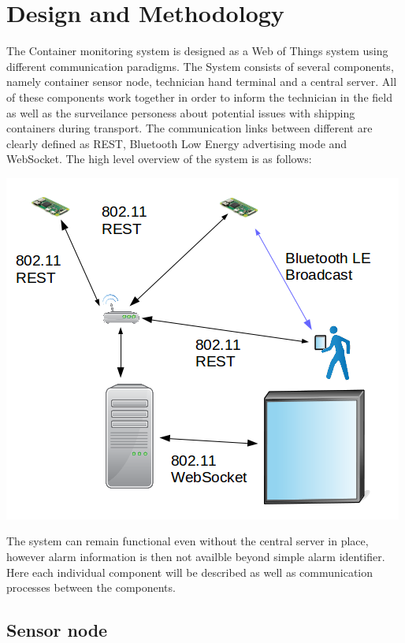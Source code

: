 \chapter{Design and Methodology}
\label{cha:design-and-method}


The Container monitoring system is designed as a Web of Things system using different communication paradigms. The System consists of several components, namely container sensor node, technician hand terminal and a central server. All of these components work together in order to inform the technician in the field as well as the surveilance personess about potential issues with shipping containers during transport. The communication links between different are clearly defined as REST, Bluetooth Low Energy advertising mode and WebSocket. The high level overview of the system is as follows:

\bigskip
\includegraphics[scale=0.5]{gfx/overview}
\bigskip

The system can remain functional even without the central server in place, however alarm information is then not availble beyond simple alarm identifier. Here each individual component will be described as well as communication processes between the components.

\section{Sensor node}
\label{sec:sensor}

